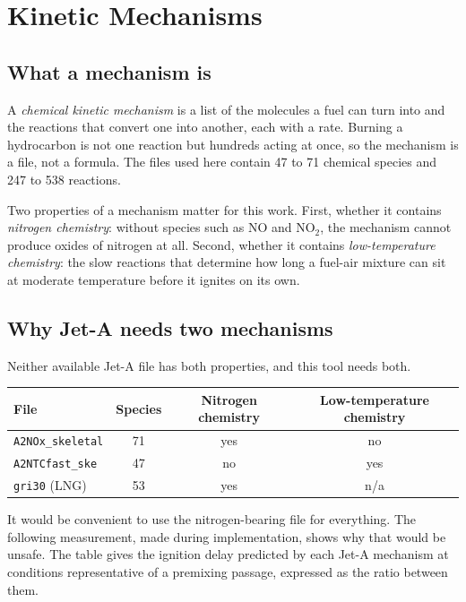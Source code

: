 \documentclass[11pt]{article}
\newcommand{\code}[1]{\nolinkurl{#1}}
\begin{document}
\section{Kinetic Mechanisms}

\subsection{What a mechanism is}

A \emph{chemical kinetic mechanism} is a list of the molecules a fuel can turn into and
the reactions that convert one into another, each with a rate. Burning a hydrocarbon is
not one reaction but hundreds acting at once, so the mechanism is a file, not a formula.
The files used here contain 47 to 71 chemical species and 247 to 538 reactions.

Two properties of a mechanism matter for this work. First, whether it contains
\emph{nitrogen chemistry}: without species such as NO and NO$_2$, the mechanism cannot
produce oxides of nitrogen at all. Second, whether it contains \emph{low-temperature
chemistry}: the slow reactions that determine how long a fuel-air mixture can sit at
moderate temperature before it ignites on its own.

\subsection{Why Jet-A needs two mechanisms}

Neither available Jet-A file has both properties, and this tool needs both.

\begin{center}
\begin{tabular}{lccc}
\toprule
File & Species & Nitrogen chemistry & Low-temperature chemistry \\
\midrule
\code{A2NOx_skeletal}  & 71 & yes & no  \\
\code{A2NTCfast_ske}   & 47 & no  & yes \\
\code{gri30} (LNG)     & 53 & yes & n/a \\
\bottomrule
\end{tabular}
\end{center}

It would be convenient to use the nitrogen-bearing file for everything. The following
measurement, made during implementation, shows why that would be unsafe. The table gives
the ignition delay predicted by each Jet-A mechanism at conditions representative of a
premixing passage, expressed as the ratio between them.
\end{document}
